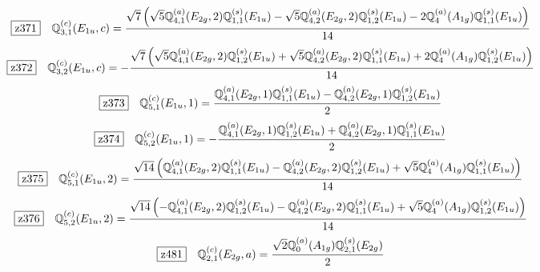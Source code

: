 \documentclass[fleqn,10pt,landscape]{jsarticle}
\begin{document}
\begin{dmath*}
\hspace*{3mm}\fbox{z371}\quad \mathbb{Q}_{3,1}^{(c)}(E_{1u},c)=\frac{\sqrt{7} \left(\sqrt{5} \mathbb{Q}_{4,1}^{(a)}(E_{2g},2) \mathbb{Q}_{1,1}^{(s)}(E_{1u}) - \sqrt{5} \mathbb{Q}_{4,2}^{(a)}(E_{2g},2) \mathbb{Q}_{1,2}^{(s)}(E_{1u}) - 2 \mathbb{Q}_{4}^{(a)}(A_{1g}) \mathbb{Q}_{1,1}^{(s)}(E_{1u})\right)}{14}
\end{dmath*}
\begin{dmath*}
\hspace*{3mm}\fbox{z372}\quad \mathbb{Q}_{3,2}^{(c)}(E_{1u},c)=- \frac{\sqrt{7} \left(\sqrt{5} \mathbb{Q}_{4,1}^{(a)}(E_{2g},2) \mathbb{Q}_{1,2}^{(s)}(E_{1u}) + \sqrt{5} \mathbb{Q}_{4,2}^{(a)}(E_{2g},2) \mathbb{Q}_{1,1}^{(s)}(E_{1u}) + 2 \mathbb{Q}_{4}^{(a)}(A_{1g}) \mathbb{Q}_{1,2}^{(s)}(E_{1u})\right)}{14}
\end{dmath*}
\begin{dmath*}
\hspace*{3mm}\fbox{z373}\quad \mathbb{Q}_{5,1}^{(c)}(E_{1u},1)=\frac{\mathbb{Q}_{4,1}^{(a)}(E_{2g},1) \mathbb{Q}_{1,1}^{(s)}(E_{1u}) - \mathbb{Q}_{4,2}^{(a)}(E_{2g},1) \mathbb{Q}_{1,2}^{(s)}(E_{1u})}{2}
\end{dmath*}
\begin{dmath*}
\hspace*{3mm}\fbox{z374}\quad \mathbb{Q}_{5,2}^{(c)}(E_{1u},1)=- \frac{\mathbb{Q}_{4,1}^{(a)}(E_{2g},1) \mathbb{Q}_{1,2}^{(s)}(E_{1u}) + \mathbb{Q}_{4,2}^{(a)}(E_{2g},1) \mathbb{Q}_{1,1}^{(s)}(E_{1u})}{2}
\end{dmath*}
\begin{dmath*}
\hspace*{3mm}\fbox{z375}\quad \mathbb{Q}_{5,1}^{(c)}(E_{1u},2)=\frac{\sqrt{14} \left(\mathbb{Q}_{4,1}^{(a)}(E_{2g},2) \mathbb{Q}_{1,1}^{(s)}(E_{1u}) - \mathbb{Q}_{4,2}^{(a)}(E_{2g},2) \mathbb{Q}_{1,2}^{(s)}(E_{1u}) + \sqrt{5} \mathbb{Q}_{4}^{(a)}(A_{1g}) \mathbb{Q}_{1,1}^{(s)}(E_{1u})\right)}{14}
\end{dmath*}
\begin{dmath*}
\hspace*{3mm}\fbox{z376}\quad \mathbb{Q}_{5,2}^{(c)}(E_{1u},2)=\frac{\sqrt{14} \left(- \mathbb{Q}_{4,1}^{(a)}(E_{2g},2) \mathbb{Q}_{1,2}^{(s)}(E_{1u}) - \mathbb{Q}_{4,2}^{(a)}(E_{2g},2) \mathbb{Q}_{1,1}^{(s)}(E_{1u}) + \sqrt{5} \mathbb{Q}_{4}^{(a)}(A_{1g}) \mathbb{Q}_{1,2}^{(s)}(E_{1u})\right)}{14}
\end{dmath*}
\begin{dmath*}
\hspace*{3mm}\fbox{z481}\quad \mathbb{Q}_{2,1}^{(c)}(E_{2g},a)=\frac{\sqrt{2} \mathbb{Q}_{0}^{(a)}(A_{1g}) \mathbb{Q}_{2,1}^{(s)}(E_{2g})}{2}
\end{dmath*}
\end{document}
